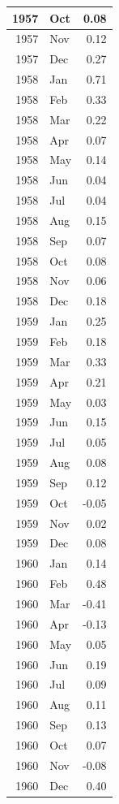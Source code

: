 \documentclass[
]{article}
\begin{document}
\begin{table}[H]
\begin{tabular}[t]{r|l|r}
\hline
1957 & Oct & 0.08\\
\hline
1957 & Nov & 0.12\\
\hline
1957 & Dec & 0.27\\
\hline
1958 & Jan & 0.71\\
\hline
1958 & Feb & 0.33\\
\hline
1958 & Mar & 0.22\\
\hline
1958 & Apr & 0.07\\
\hline
1958 & May & 0.14\\
\hline
1958 & Jun & 0.04\\
\hline
1958 & Jul & 0.04\\
\hline
1958 & Aug & 0.15\\
\hline
1958 & Sep & 0.07\\
\hline
1958 & Oct & 0.08\\
\hline
1958 & Nov & 0.06\\
\hline
1958 & Dec & 0.18\\
\hline
1959 & Jan & 0.25\\
\hline
1959 & Feb & 0.18\\
\hline
1959 & Mar & 0.33\\
\hline
1959 & Apr & 0.21\\
\hline
1959 & May & 0.03\\
\hline
1959 & Jun & 0.15\\
\hline
1959 & Jul & 0.05\\
\hline
1959 & Aug & 0.08\\
\hline
1959 & Sep & 0.12\\
\hline
1959 & Oct & -0.05\\
\hline
1959 & Nov & 0.02\\
\hline
1959 & Dec & 0.08\\
\hline
1960 & Jan & 0.14\\
\hline
1960 & Feb & 0.48\\
\hline
1960 & Mar & -0.41\\
\hline
1960 & Apr & -0.13\\
\hline
1960 & May & 0.05\\
\hline
1960 & Jun & 0.19\\
\hline
1960 & Jul & 0.09\\
\hline
1960 & Aug & 0.11\\
\hline
1960 & Sep & 0.13\\
\hline
1960 & Oct & 0.07\\
\hline
1960 & Nov & -0.08\\
\hline
1960 & Dec & 0.40\\

\end{tabular}
\end{table}
\end{document}
